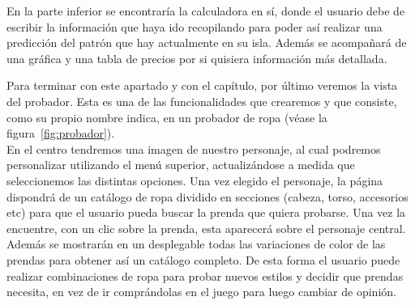 En la parte inferior se encontraría la calculadora en sí, donde el usuario debe de escribir la información que haya ido recopilando para poder así realizar una predicción del patrón que hay actualmente en su isla. Además se acompañará de una gráfica y una tabla de precios por si quisiera información más detallada.\\


Para terminar con este apartado y con el capítulo, por último veremos la vista del probador. Esta es una de las funcionalidades que crearemos y que consiste, como su propio nombre indica, en un probador de ropa {(v\'ease la figura~\ref{fig:probador})}.\\

En el centro tendremos una imagen de nuestro personaje, al cual podremos personalizar utilizando el menú superior, actualizándose a medida que seleccionemos las distintas opciones. Una vez elegido el personaje, la página dispondrá de un catálogo de ropa dividido en secciones (cabeza, torso, accesorios etc) para que el usuario pueda buscar la prenda que quiera probarse. Una vez la encuentre, con un clic sobre la prenda, esta aparecerá sobre el personaje central. Además se mostrarán en un desplegable todas las variaciones de color de las prendas para obtener así un catálogo completo. De esta forma el usuario puede realizar combinaciones de ropa para probar nuevos estilos y decidir que prendas necesita, en vez de ir comprándolas en el juego para luego cambiar de opinión.\\





